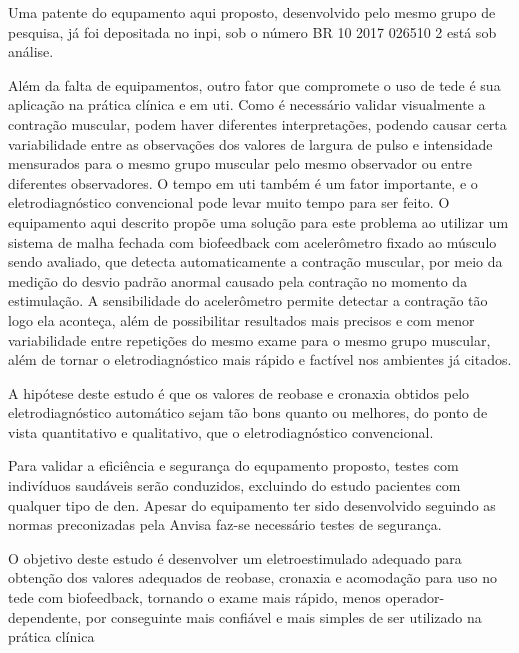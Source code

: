 Uma patente do equpamento aqui proposto, desenvolvido pelo mesmo grupo de pesquisa, já foi depositada no \ac{inpi}, sob o número BR 10 2017 026510 2 está sob análise.

Além da falta de equipamentos, outro fator que compromete o uso de \ac{tede} é sua aplicação na prática clínica e em \ac{uti}. Como é necessário validar visualmente a contração muscular, podem haver diferentes interpretações, podendo causar certa variabilidade entre as observações dos valores de largura de pulso e intensidade mensurados para o mesmo grupo muscular pelo mesmo observador ou entre diferentes observadores. O tempo em \ac{uti} também é um fator importante, e o eletrodiagnóstico convencional pode levar muito tempo para ser feito. O equipamento aqui descrito propõe uma solução para este problema ao utilizar um sistema de malha fechada com biofeedback com acelerômetro fixado ao músculo sendo avaliado, que detecta automaticamente a contração muscular, por meio da medição do desvio padrão anormal causado pela contração no momento da estimulação. A sensibilidade do acelerômetro permite detectar a contração tão logo ela aconteça, além de possibilitar resultados mais precisos e com menor variabilidade entre repetições do mesmo exame para o mesmo grupo muscular, além de tornar o eletrodiagnóstico mais rápido e factível nos ambientes já citados. 

A hipótese deste estudo é que os valores de reobase e cronaxia obtidos pelo eletrodiagnóstico automático sejam tão bons quanto ou melhores, do ponto de vista quantitativo e qualitativo, que o eletrodiagnóstico convencional.

Para validar a eficiência e segurança do equpamento proposto, testes com indivíduos saudáveis serão conduzidos, excluindo do estudo pacientes com qualquer tipo de \ac{den}. Apesar do equipamento ter sido desenvolvido seguindo as normas preconizadas pela Anvisa faz-se necessário testes de segurança.

O objetivo deste estudo é desenvolver um eletroestimulado adequado para obtenção dos valores adequados de reobase, cronaxia e acomodação para uso no \ac{tede} com biofeedback, tornando o exame mais rápido, menos operador-dependente, por conseguinte mais confiável e mais simples de ser utilizado na prática clínica



